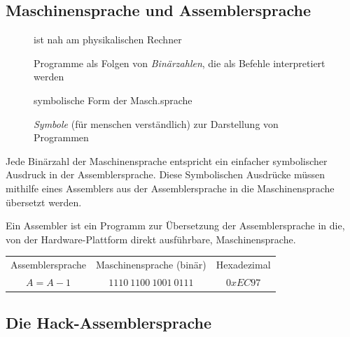 \documentclass[12pt]{report}
\begin{document}
\subsection{Maschinensprache und Assemblersprache}
\begin{figure}[H]
  \begin{minipage}[t]{0.5\textwidth}
    \begin{defbox}[Maschinensprache]
      ist nah am physikalischen Rechner

      Programme als Folgen von \textit{Binärzahlen}, die als Befehle interpretiert werden
    \end{defbox}
  \end{minipage}
  \hfill
  \begin{minipage}[t]{0.5\textwidth}
    \begin{defbox}[Assemblersprache]
      symbolische Form der Masch.sprache

      \textit{Symbole} (für menschen verständlich) zur Darstellung von Programmen
    \end{defbox}
  \end{minipage}
\end{figure}

Jede Binärzahl der Maschinensprache entspricht ein einfacher symbolischer Ausdruck in der Assemblersprache.
Diese Symbolischen Ausdrücke müssen mithilfe eines Assemblers aus der Assemblersprache in die Maschinensprache übersetzt werden.

\begin{defbox}
  Ein Assembler ist ein Programm zur Übersetzung der Assemblersprache in die, 
  von der Hardware-Plattform direkt ausführbare, Maschinensprache.
\end{defbox}

\begin{exbox}
  \begin{table}[H]
    \centering
    \begin{tabular}{ccc}
      Assemblersprache & Maschinensprache (binär) & Hexadezimal \\
      $A = A-1$        & $1110\ 1100\ 1001\ 0111$ & $0xEC97$
    \end{tabular}
  \end{table}
\end{exbox}

\subsection{Die Hack-Assemblersprache}
\end{document}
